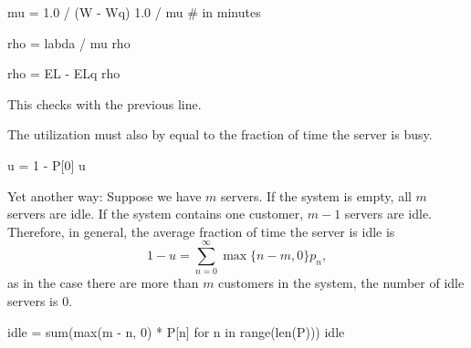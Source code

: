 \documentclass[companion]{subfiles}
\begin{document}
\begin{extra}[Hall 5.2]
\begin{solution}
\begin{pyconsole}
mu = 1.0 / (W - Wq)
1.0 / mu  # in minutes

rho = labda / mu
rho
\end{pyconsole}

\begin{pyconsole}
rho = EL - ELq
rho
\end{pyconsole}
This checks with the previous line.

The utilization must also by equal to the fraction of time the server is busy. 
\begin{pyconsole}
u = 1 - P[0]
u
\end{pyconsole}

Yet another way: Suppose we have $m$ servers. If the system is empty,
all $m$ servers are idle. If the system contains one customer, $m-1$
servers are idle. Therefore, in general, the average fraction of time
the server is idle is
\begin{equation*}
1- u = \sum_{n=0}^\infty \max\{n-m, 0\} p_n,
\end{equation*}
as in the case there are more than $m$ customers in the system, the
number of idle servers is $0$.


\begin{pyconsole}
idle = sum(max(m - n, 0) * P[n] for n in range(len(P)))
idle
\end{pyconsole}

\end{solution}
 
\end{extra}
\end{document}
